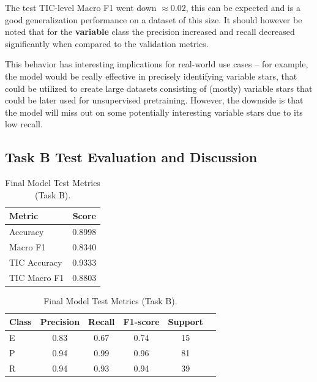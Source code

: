 The test TIC-level Macro F1 went down $\approx 0.02$, this can be expected and is a good generalization performance on a dataset of this size.
It should however be noted that for the \textbf{variable} class the precision increased and recall decreased significantly when compared to the validation metrics.

This behavior has interesting implications for real-world use cases -- for example, the model would be really effective in precisely identifying variable stars, that could be utilized to create large datasets consisting of (mostly) variable stars that could be later used for unsupervised pretraining.
However, the downside is that the model will miss out on some potentially interesting variable stars due to its low recall.

\subsection{Task B Test Evaluation and Discussion}

\begin{table}[H]
    \centering
    \footnotesize
    \renewcommand{\arraystretch}{1.1}

    \begin{minipage}[t]{0.32\textwidth}
        \centering
        \begin{tabularx}{\textwidth}{X c}
            \toprule
            \textbf{Metric} & \textbf{Score} \tabularnewline
            \midrule
            Accuracy    &  0.8998 \tabularnewline
            Macro F1    & 0.8340 \tabularnewline
            TIC Accuracy & 0.9333 \tabularnewline
            TIC Macro F1 & 0.8803 \tabularnewline
            \bottomrule
        \end{tabularx}
    \end{minipage}
    \hfill
    \begin{minipage}[t]{0.64\textwidth}
        \centering
        \footnotesize
        \begin{tabularx}{\textwidth}{X c c c c c}
            \toprule
            \textbf{Class} & \textbf{Precision} & \textbf{Recall} & \textbf{F1-score} & \textbf{Support} \tabularnewline
            \midrule
            E & 0.83 & 0.67 & 0.74 & 15 \tabularnewline
            P & 0.94 & 0.99 & 0.96 & 81   \tabularnewline
            R & 0.94 & 0.93 & 0.94 & 39   \tabularnewline
            \bottomrule
        \end{tabularx}
    \end{minipage}

    \caption[Final Model Test Metrics (B)]{Final Model Test Metrics (Task B).}
    \label{tab:06_final_model_test_metrics_B}
\end{table}

